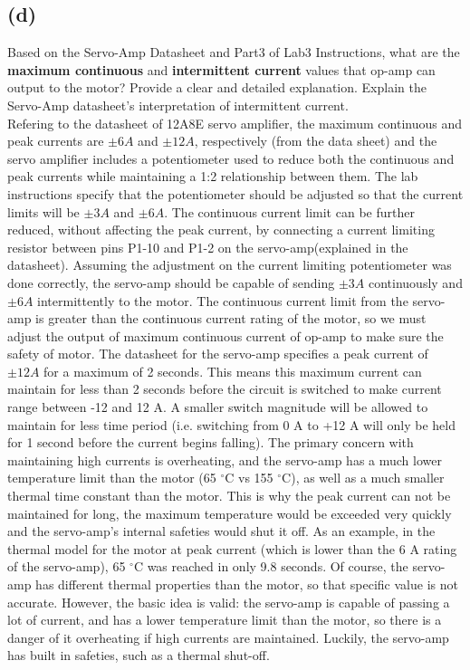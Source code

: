 \documentclass[letterpaper]{article}
\begin{document}
\subsection*{(d)}
Based on the Servo-Amp Datasheet and Part3 of Lab3 Instructions, what are the \textbf{maximum continuous} and \textbf{intermittent current} values that op-amp can output to the motor? Provide a clear and detailed explanation. Explain the Servo-Amp datasheet's interpretation of intermittent current.\\

Refering to the datasheet of 12A8E servo amplifier, the maximum continuous and peak currents are $\pm 6A$ and $\pm 12A$, respectively (from the data sheet) and the servo amplifier includes a potentiometer used to reduce both the continuous and peak currents while maintaining a 1:2 relationship between them. The lab instructions specify that the potentiometer should be adjusted so that the current limits will be $\pm 3A$ and $\pm 6A$.  The continuous current limit can be further reduced, without affecting the peak current, by connecting a current limiting resistor between pins P1-10 and P1-2 on the servo-amp(explained in the datasheet). Assuming the adjustment on the current limiting potentiometer was done correctly, the servo-amp should be capable of sending $\pm 3A$ continuously and $\pm6A$ intermittently to the motor. The continuous current limit from the servo-amp is greater than the continuous current rating of the motor, so we must adjust the output of maximum continuous current of op-amp to make sure the safety of motor.
The datasheet for the servo-amp specifies a peak current of $\pm12 A$ for a maximum of 2 seconds. This means this maximum current can maintain for less than 2 seconds before the circuit is switched to make current range between -12 and 12 A. A smaller switch magnitude will be allowed to maintain for less time period (i.e. switching from 0 A to +12 A will only be held for 1 second before the current begins falling). The primary concern with maintaining high currents is overheating, and the servo-amp has a much lower temperature limit than the motor (65 $^\circ$C vs 155 $^\circ$C), as well as a much smaller thermal time constant than the motor.  This is why the peak current can not be maintained for long, the maximum temperature would be exceeded very quickly and the servo-amp's internal safeties would shut it off. As an example, in the thermal model for the motor at peak current (which is lower than the 6 A rating of the servo-amp), 65 $^\circ$C was reached in only 9.8 seconds. Of course, the servo-amp has different thermal properties than the motor, so that specific value is not accurate. However, the basic idea is valid: the servo-amp is capable of passing a lot of current, and has a lower temperature limit than the motor, so there is a danger of it overheating if high currents are maintained. Luckily, the servo-amp has built in safeties, such as a thermal shut-off.
\end{document}
